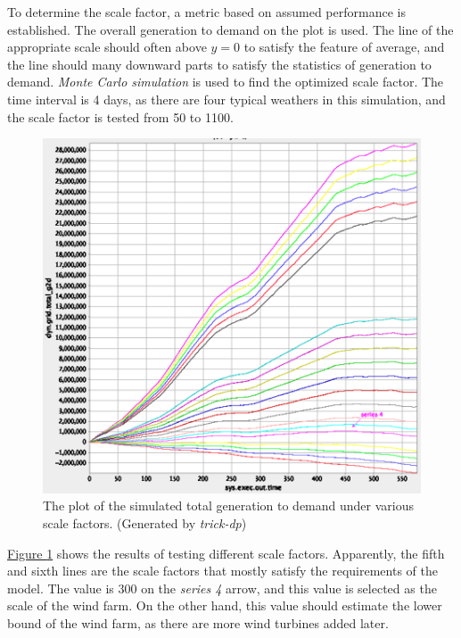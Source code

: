 \documentclass[12pt,a4paper]{report}
\begin{document}
            To determine the scale factor, a metric based on assumed performance is established. The overall generation to demand on the plot is used. The line of the appropriate scale should often above $ y = 0$ to satisfy the feature of average, and the line should many downward parts to satisfy the statistics of generation to demand. \emph{Monte Carlo simulation} is used to find the optimized scale factor. The time interval is 4 days, as there are four typical weathers in this simulation, and the scale factor is tested from 50 to 1100.

            \begin{figure}[ht]
                \centerline{\includegraphics[scale=1.7]{scale_factor}}
                \caption{The plot of the simulated total generation to demand under various scale factors. (Generated by \emph{trick-dp})}
                \label{fig_scale_factor_monte}
            \end{figure}

            \hyperref[fig_scale_factor_monte]{Figure \ref*{fig_scale_factor_monte}} shows the results of testing different scale factors. Apparently, the fifth and sixth lines are the scale factors that mostly satisfy the requirements of the model. The value is 300 on the \emph{series 4} arrow, and this value is selected as the scale of the wind farm. On the other hand, this value should estimate the lower bound of the wind farm, as there are more wind turbines added later.
\end{document}
